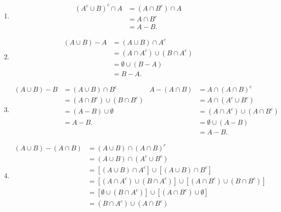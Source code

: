 \begin{enumerate}
\begin{enumerate}
\item \begin{align*}
\left( A^c \cup B \right)^c \cap A &= \left( A \cap B^c \right) \cap A \\
                                   &= A \cap B^c \\
                                   &= A - B.
\end{align*}

\item \begin{align*}
(A \cup B) - A &= (A \cup B) \cap A^c \\
               &= (A \cap A^c) \cup (B \cap A^c) \\
               &= \emptyset \cup (B - A) \\
               &= B - A.
\end{align*}

\item \begin{align*}
(A \cup B) - B &= (A \cup B) \cap B^c  &  A - (A \cap B) &= A \cap (A \cap B)^c \\
               &= (A \cap B^c) \cup (B \cap B^c) &       &= A \cap (A^c \cup B^c)  \\
               &= (A - B) \cup \emptyset         &       &= (A \cap A^c) \cup (A \cap B^c) \\
               &= A - B.                         &       &= \emptyset \cup (A - B) \\
               &                                 &       &= A - B.
\end{align*}

\item \begin{align*}
(A \cup B) - (A \cap B) &= (A \cup B) \cap (A \cap B)^c \\
                        &= (A \cup B) \cap (A^c \cup B^c) \\
               &= \left[ (A \cup B) \cap A^c \right] \cup \left[ (A \cup B) \cap B^c \right] \\
               &= \left[ (A \cap A^c) \cup (B \cap A^c) \right] \cup \left[ (A \cap B^c) \cup (B \cap B^c) \right] \\
               &= \left[ \emptyset \cup (B \cap A^c) \right] \cup \left[ (A \cap B^c) \cup \emptyset \right] \\
               &= (B \cap A^c) \cup (A \cap B^c)
\end{align*}
\end{enumerate}
\end{enumerate}



